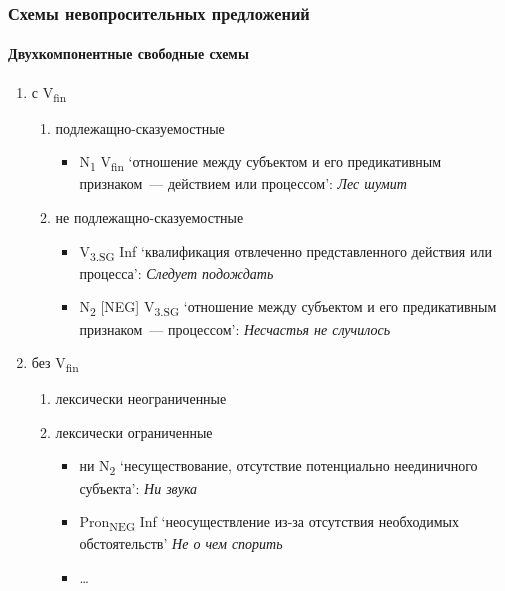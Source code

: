 \begin{frame}
  \frametitle{Схемы невопросительных предложений}
  \framesubtitle{Двухкомпонентные свободные схемы}
  \small

  \begin{enumerate}
    \item с V\textsubscript{fin} \begin{enumerate}
      \item подлежащно-сказуемостные \begin{itemize}
        \item N\textsubscript{1} V\textsubscript{fin} `отношение между субъектом и его предикативным признаком~--- действием или процессом': \textit{Лес шумит}
      \end{itemize}
      \item не подлежащно-сказуемостные \begin{itemize}
        \item V\textsubscript{3.\textsc{SG}} Inf `квалификация отвлеченно представленного действия или процесса': \textit{Следует подождать}
        \item N\textsubscript{2} [\textsc{NEG}] V\textsubscript{3.\textsc{SG}} `отношение между субъектом и его предикативным признаком~--- процессом': \textit{Несчастья не случилось}
      \end{itemize}
    \end{enumerate}

    \item<2-> без V\textsubscript{fin} \begin{enumerate}
      \item лексически неограниченные
      \item лексически ограниченные \begin{itemize}
        \item ни N\textsubscript{2} `несуществование, отсутствие потенциально неединичного субъекта': \textit{Ни звука}
        \item Pron\textsubscript{\textsc{NEG}} Inf `неосуществление из-за отсутствия необходимых обстоятельств' \textit{Не о чем спорить}
        \item \ldots
      \end{itemize}
    \end{enumerate}
  \end{enumerate}
\end{frame}

